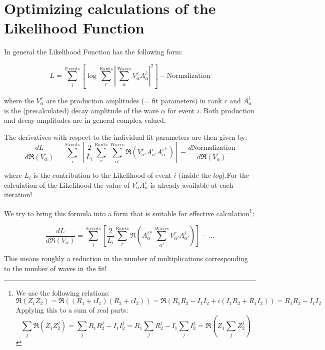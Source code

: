 \documentclass[12pt,draft,a4paper]{article}
\begin{document}
\newcommand{\ma}[4]{\begin{pmatrix}
 #1& #2 \\
 #3 & #4
\end{pmatrix}}



\section{Optimizing calculations of the Likelihood Function}

In general the Likelihood Function has the following form:

\[L=\sum_i^{\text{Events}}\left[ \log\sum_r^{\text{Ranks}}\left|\sum_\alpha^{\text{Waves}} V_{\alpha}^r A_\alpha^i \right|^2\right]-\text{Normalization}\]

where the $V_\alpha^r$ are the production amplitudes (= fit parameters) in rank $r$ and $A_\alpha^i$ is the (precalculated) decay amplitude of the wave $\alpha$ for event $i$. Both production and decay amplitudes are in general complex valued.

The derivatives with respect to the individual fit parameters are then given by:
\[\frac{dL}{d\Re(V_\alpha)}=\sum_i^{\text{Events}}\left[\frac{2}{L_i}\sum_r^{\text{Ranks}}\sum_{\alpha'}^{\text{Waves}} \Re(V_{\alpha'}^{r} A_{\alpha'}^{i} A_{\alpha}^{i*})  \right] - \frac{d\text{Normalization}}{d\Re(V_\alpha)}\]

where $L_i$ is the contribution to the Likelihood of event $i$ (inside the $log$).For the calculation of the Likelihood the value of $V_{\alpha}^r A_\alpha^i$ is already available at each iteration!


We try to bring this formula into a form that is suitable for effective calculation\footnote{We use the following relations: \[\Re(Z_1Z_2)=\Re((R_1+iI_1)(R_2+iI_2))=\Re(R_1R_2-I_1I_2+i(I_1R_2+R_1I_2))=R_1R_2-I_1I_2\] Applying this to a sum of real parts: \[\sum_j\Re(Z_1Z_2^j)=\sum_jR_1R_2^j-I_1I_2^j=R_1\sum_jR_2^j-I_1\sum_jI_2^j=\Re\left(Z_1\sum_jZ_2^j\right)\]}:

\[\frac{dL}{d\Re(V_\alpha)}=\sum_i^{\text{Events}}\left[\frac{2}{L_i}\sum_r^{\text{Ranks}}\Re\left(A_{\alpha}^{i*}\sum_{\alpha'}^{\text{Waves}} V_{\alpha'}^{r} A_{\alpha'}^{i} \right)  \right] - ...\]


This means roughly a reduction in the number of multiplications corresponding to the number of waves in the fit!
\end{document}
